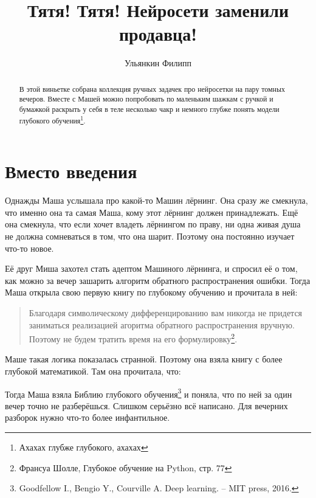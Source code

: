 \documentclass[12pt, a4paper, oneside]{article}
\title{Тятя! Тятя! Нейросети заменили продавца!}
\date{ }
\author{Ульянкин Филипп}
\begin{document}
\toggletrue{lecture}

\maketitle
	
\begin{abstract}
    В этой виньетке собрана коллекция ручных задачек про нейросетки на пару томных вечеров. Вместе с Машей можно попробовать по маленьким шажкам с ручкой и бумажкой раскрыть у себя в теле несколько чакр и немного глубже понять модели глубокого обучения\footnote{Ахахах глубже глубокого, ахахах}.
\end{abstract}

\section*{Вместо введения}
    Однажды Маша услышала про какой-то Машин лёрнинг. Она сразу же смекнула, что именно она та самая Маша, кому этот лёрнинг должен принадлежать. Ещё она смекнула, что если хочет владеть лёрнингом по праву, ни одна живая душа не должна сомневаться в том, что она шарит. Поэтому она постоянно изучает что-то новое. 
    
    Её друг Миша захотел стать адептом Машиного лёрнинга, и спросил её о том, как можно за вечер зашарить алгоритм обратного распространения ошибки. Тогда Маша открыла свою первую книгу по глубокому обучению и прочитала в ней: 
    
    \begin{quote}
    Благодаря символическому дифференцированию вам никогда не придется заниматься реализацией агоритма обратного распространения вручную. Поэтому не будем тратить время на его формулировку\footnote{Франсуа Шолле, Глубокое обучение на Python, стр. 77}.
    \end{quote} 
    
    Маше такая логика показалась странной. Поэтому она взяла книгу с более глубокой математикой. Там она прочитала, что: 
    
    \begin{quote}
    \end{quote} 
    
    Тогда Маша взяла Библию глубокого обучения\footnote{Goodfellow I., Bengio Y., Courville A. Deep learning. – MIT press, 2016.} и поняла, что по ней за один вечер точно не разберёшься. Слишком серьёзно всё написано. Для вечерних разборок нужно что-то более инфантильное. 
    
\end{document}
